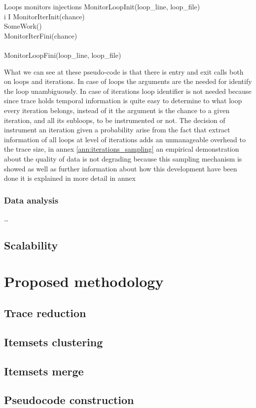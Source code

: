 \begin{pseudocode}{Loops monitors injections}{ }
\label{pc:mercurium_loops_trans}
    MonitorLoopInit(loop_{line}, loop_{file})\\
    \FOR i \in I \DO
	\BEGIN
        MonitorIterInit(chance)\\
        SomeWork()\\
        MonitorIterFini(chance)\\
	\END\\
    MonitorLoopFini(loop_{line}, loop_{file})\\
\end{pseudocode}

What we can see at these pseudo-code is that there is entry and exit calls both on
loops and iterations. In case of loops the arguments are the needed for identify
the loop unambiguously. In case of iterations loop identifier is not needed
because since trace holds temporal information is quite easy to determine to
what loop every iteration belongs, instead of it the argument is the chance to a
given iteration, and all its subloops, to be instrumented or not. The decision of
instrument an iteration given a probability arise from the fact that extract
information of all loops at level of iterations adds an unmanageable overhead to
the trace size, in annex \ref{ann:iterations_sampling} an empirical demonstration 
about the quality of data is not degrading because this sampling mechanism is 
showed as well as further information about how this development have
been done it is explained in more detail in annex 

\subsubsection{Data analysis}

\ldots


\subsection{Scalability}\label{ss:scalability}

\section{Proposed methodology}

\subsection{Trace reduction}

\subsection{Itemsets clustering}

\subsection{Itemsets merge}

\subsection{Pseudocode construction}
